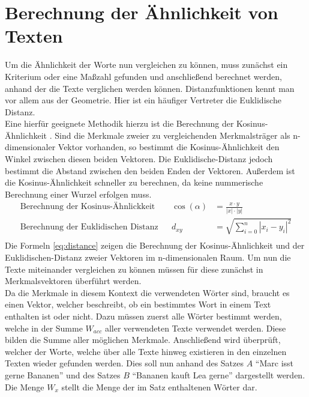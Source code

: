 \section{Berechnung der Ähnlichkeit von Texten}
\label{sec:berechnung_texteahnlichkeit}
Um die Ähnlichkeit der Worte nun vergleichen zu können, muss zunächst ein Kriterium oder eine Maßzahl gefunden und anschließend berechnet werden, anhand der die Texte verglichen werden können. Distanzfunktionen kennt man vor allem aus der Geometrie. Hier ist ein häufiger Vertreter die Euklidische Distanz. \\ \newline
Eine hierfür geeignete Methodik hierzu ist die Berechnung der Kosinus-Ähnlichkeit \cite[2]{Godfrey.21.08.2014}. Sind die Merkmale zweier zu vergleichenden Merkmalsträger als n-dimensionaler Vektor vorhanden, so bestimmt die Kosinus-Ähnlichkeit den Winkel zwischen diesen beiden Vektoren. Die Euklidische-Distanz jedoch  bestimmt die Abstand zwischen den beiden Enden der Vektoren. Außerdem ist die Kosinus-Ähnlichkeit schneller zu berechnen, da keine nummerische Berechnung einer Wurzel erfolgen muss. 
\begin{equation}
	\begin{aligned} 
		\text{Berechnung der Kosinus-Ähnlickkeit}&& 
		\cos(\alpha)&=\frac{x\cdot y}{\left|x\right|\cdot \left|y\right|} \\
		\text{Berechnung der Euklidischen Distanz}&& 
		{d}_{xy}&=\sqrt{\sum _{i=0}^{n}{\left|{x}_{i}-{y}_{i}\right|}^{2}} \\  
	\end{aligned} 
	\label{eq:distance}
\end{equation}
Die Formeln \eqref{eq:distance} zeigen die Berechnung der Kosinus-Ähnlichkeit und der Euklidischen-Distanz zweier Vektoren im n-dimensionalen Raum. Um nun die Texte miteinander vergleichen zu können müssen für diese zunächst in Merkmalsvektoren überführt werden. \\ \newline
Da die Merkmale in diesem Kontext die verwendeten Wörter sind, braucht es einen Vektor, welcher beschreibt, ob ein bestimmtes Wort in einem Text enthalten ist oder nicht. Dazu müssen zuerst alle Wörter bestimmt werden, welche in der Summe $W_{acc}$ aller verwendeten Texte verwendet werden. Diese bilden die Summe aller möglichen Merkmale. Anschließend wird überprüft, welcher der Worte, welche über alle Texte hinweg existieren in den einzelnen Texten wieder gefunden werden. Dies soll nun anhand des Satzes $A$ "`Marc isst gerne Bananen"' und des Satzes $B$ "`Bananen kauft Lea gerne"' dargestellt werden. Die Menge $W_{x}$ stellt die Menge der im Satz enthaltenen Wörter dar. 
